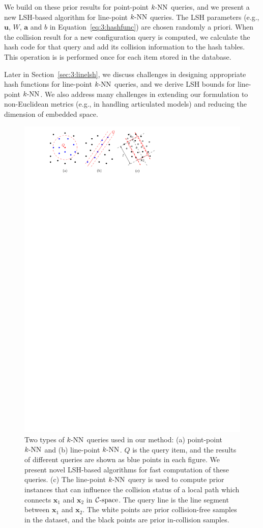 We build on these prior results for point-point $\knn$ queries, and we present a new LSH-based algorithm for line-point $\knn$ queries. The LSH parameters (e.g., $\mathbf u$, $W$, $\mathbf a$ and $b$ in Equation~\ref{eq:3:hashfunc}) are chosen randomly a priori. When the collision result for a new configuration query is computed, we calculate the hash code for that query and add its collision information to the hash tables. This operation is is performed once for each item stored in the database.

Later in Section~\ref{sec:3:linelsh}, we discuss challenges in designing appropriate hash functions for line-point $\knn$ queries, and we derive LSH bounds for line-point $\knn$. We also address many challenges in extending our formulation to non-Euclidean metrics (e.g., in handling articulated models) and reducing the dimension of embedded space.

\begin{figure}[t]
  \begin{center}
  \includegraphics[width=0.7\linewidth]{figs/3/KNN.pdf}
  \caption[Two types of $\knn$ queries used in instance-based learning]{Two types of $\knn$ queries used in our method: (a) point-point $\knn$ and (b) line-point $\knn$. $Q$ is the query item, and the results of different queries are shown as blue points in each figure. We present novel LSH-based algorithms for fast computation of these queries. (c) The line-point $\knn$ query is used to compute prior instances that can influence the collision status of a local path which connects $\mathbf x_1$ and $\mathbf x_2$ in $\mathcal C\text{-space}$. The query line is the line segment between $\mathbf x_1$ and $\mathbf x_2$. The white points are prior collision-free samples in the dataset, and the black points are prior in-collision samples.   \label{fig:3:KNN}}
\end{center}
\end{figure}





